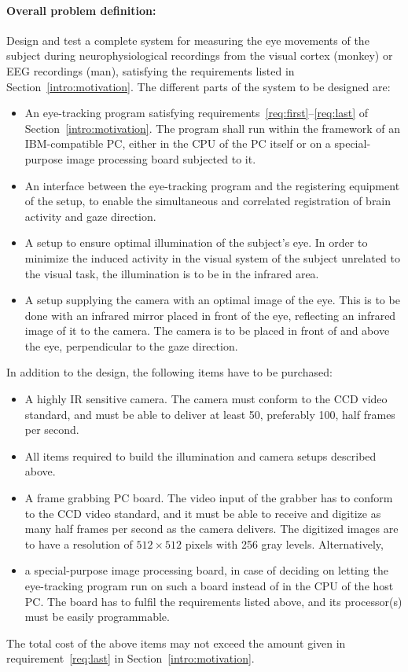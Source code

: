\paragraph{Overall problem definition:} 
Design and test a complete system for measuring the eye movements of
the subject during neurophysiological recordings from the visual
cortex (monkey) or EEG recordings (man), satisfying the requirements
listed in Section~\ref{intro:motivation}.  The different parts of the
system to be designed are:
\begin{itemize}
\item An eye-tracking program satisfying
  requirements~\ref{req:first}--\ref{req:last} of
  Section~\ref{intro:motivation}.  The program shall run within the
  framework of an IBM-compatible PC, either in the CPU of the PC
  itself or on a special-purpose image processing board subjected to
  it.
\item An interface between the eye-tracking program and the
  registering equipment of the setup, to enable the simultaneous and
  correlated registration of brain activity and gaze direction.
\item A setup to ensure optimal illumination of the subject's eye.  In
  order to minimize the induced activity in the visual system of the
  subject unrelated to the visual task, the illumination is to be in
  the infrared area.
\item A setup supplying the camera with an optimal image of the eye.
  This is to be done with an infrared mirror placed in front of the
  eye, reflecting an infrared image of it to the camera.  The camera
  is to be placed in front of and above the eye, perpendicular to the
  gaze direction.
\end{itemize}
In addition to the design, the following items have to be purchased:
\begin{itemize}
\item A highly IR sensitive camera.  The camera must conform to the
  CCD video standard, and must be able to deliver at least 50,
  preferably 100, half frames per second.
\item All items required to build the illumination and camera setups
  described above.
\item A frame grabbing PC board.  The video input of the grabber has
  to conform to the CCD video standard, and it must be able to receive
  and digitize as many half frames per second as the camera delivers.
  The digitized images are to have a resolution of $512\times 512$
  pixels with 256 gray levels.  Alternatively,
\item a special-purpose image processing board, in case of deciding on
  letting the eye-tracking program run on such a board instead of in
  the CPU of the host PC.  The board has to fulfil the requirements
  listed above, and its processor(s) must be easily programmable.
\end{itemize}
The total cost of the above items may not exceed the amount given in
requirement~\ref{req:last} in Section~\ref{intro:motivation}.
\vspace*{0.1cm}


